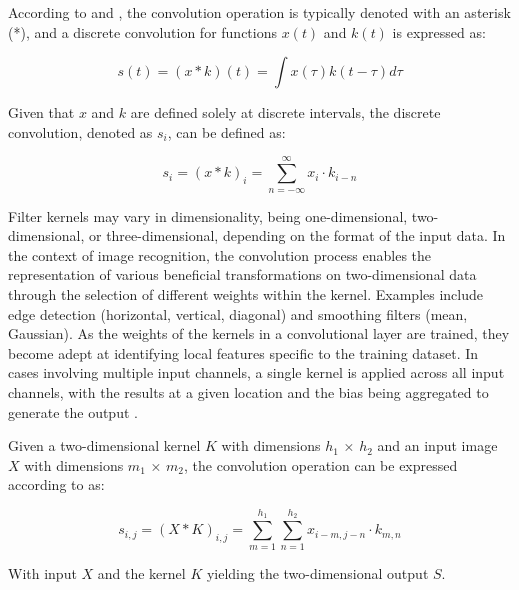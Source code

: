 According to \textcite{Goodfellow2016} and \textcite{Rothmund2018}, the convolution operation is typically denoted with an asterisk (*), and a discrete convolution for functions $x(t)$ and $k(t)$ is expressed as:

\begin{equation}
    \label{eq:cnn_discrete_convolution}
    s(t) = (x * k)(t) = \int x(\tau)k(t-\tau)d\tau
\end{equation}

Given that $x$ and $k$ are defined solely at discrete intervals, the discrete convolution, denoted as $s_i$, can be defined as:

\begin{equation}
    \label{eq:cnn_discrete_convolution_si}
    s_i = (x * k)_i = \sum_{n=-\infty}^{\infty} x_i \cdot k_{i-n} 
\end{equation}

Filter kernels may vary in dimensionality, being one-dimensional, two-dimensional, or three-dimensional, depending on the format of the input data. In the context of image recognition, the convolution process enables the representation of various beneficial transformations on two-dimensional data through the selection of different weights within the kernel. Examples include edge detection (horizontal, vertical, diagonal) and smoothing filters (mean, Gaussian). As the weights of the kernels in a convolutional layer are trained, they become adept at identifying local features specific to the training dataset. In cases involving multiple input channels, a single kernel is applied across all input channels, with the results at a given location and the bias being aggregated to generate the output \cite{Bishop2023}. 

Given a two-dimensional kernel $K$ with dimensions $h_1$ × $h_2$ and an input image $X$ with dimensions $m_1$ × $m_2$, the convolution operation can be expressed according to \textcite{Rothmund2018} as:

\begin{equation}
    \label{eq:cnn_convolution_2D_1}
    s_{i, j}=(X * K)_{i, j}=\sum_{m=1}^{h_1} \sum_{n=1}^{h_2} x_{i-m, j-n} \cdot k_{m, n}
\end{equation}

With input $X$ and the kernel $K$ yielding the two-dimensional output $S$.

